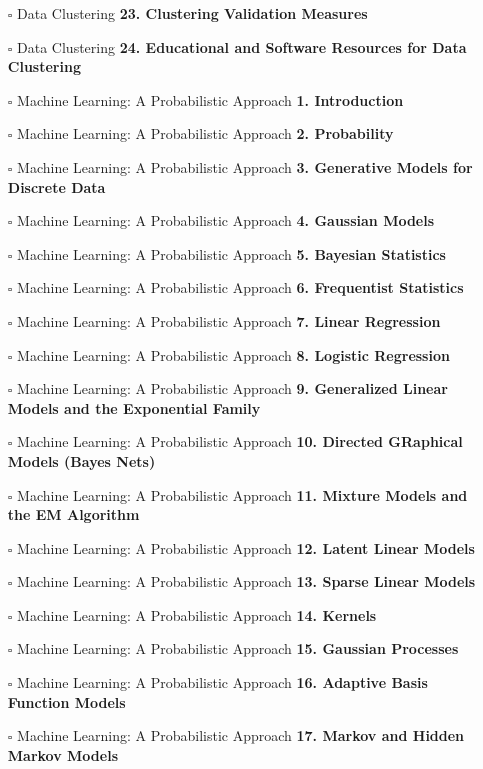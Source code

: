 \documentclass[a4, landscape, 12pt]{article}
\newcommand{\checkbox}{$\square$}%
\begin{document}
\begin{itemize}
{}
\item [\checkbox]  Data Clustering \textbf{ 23. Clustering Validation Measures
}
\item [\checkbox]  Data Clustering \textbf{ 24. Educational and Software Resources for Data Clustering
}
\item [\checkbox]  Machine Learning: A Probabilistic Approach \textbf{ 1. Introduction
}
\item [\checkbox]  Machine Learning: A Probabilistic Approach \textbf{ 2. Probability
}
\item [\checkbox]  Machine Learning: A Probabilistic Approach \textbf{ 3. Generative Models for Discrete Data
}
\item [\checkbox]  Machine Learning: A Probabilistic Approach \textbf{ 4. Gaussian Models
}
\item [\checkbox]  Machine Learning: A Probabilistic Approach \textbf{ 5. Bayesian Statistics
}
\item [\checkbox]  Machine Learning: A Probabilistic Approach \textbf{ 6. Frequentist Statistics
}
\item [\checkbox]  Machine Learning: A Probabilistic Approach \textbf{ 7. Linear Regression
}
\item [\checkbox]  Machine Learning: A Probabilistic Approach \textbf{ 8. Logistic Regression
}
\item [\checkbox]  Machine Learning: A Probabilistic Approach \textbf{ 9. Generalized Linear Models and the Exponential Family
}
\item [\checkbox]  Machine Learning: A Probabilistic Approach \textbf{ 10. Directed GRaphical Models (Bayes Nets)
}
\item [\checkbox]  Machine Learning: A Probabilistic Approach \textbf{ 11. Mixture Models and the EM Algorithm
}
\item [\checkbox]  Machine Learning: A Probabilistic Approach \textbf{ 12. Latent Linear Models
}
\item [\checkbox]  Machine Learning: A Probabilistic Approach \textbf{ 13. Sparse Linear Models
}
\item [\checkbox]  Machine Learning: A Probabilistic Approach \textbf{ 14. Kernels
}
\item [\checkbox]  Machine Learning: A Probabilistic Approach \textbf{ 15. Gaussian Processes
}
\item [\checkbox]  Machine Learning: A Probabilistic Approach \textbf{ 16. Adaptive Basis Function Models
}
\item [\checkbox]  Machine Learning: A Probabilistic Approach \textbf{ 17. Markov and Hidden Markov Models
}
\end{itemize}
\end{document}
